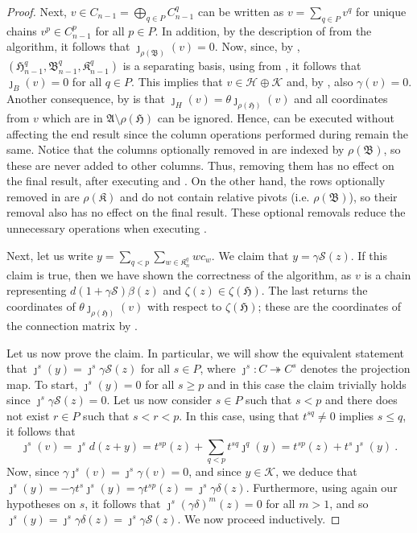 \documentclass[11pt, table, nothms]{amsart}
\theoremstyle{definition}
\newcommand{\C}{C}
\newcommand{\cK}{\mathcal{K}}
\newcommand{\cS}{\mathcal{S}}
\newcommand{\cH}{\mathcal{H}}
\newcommand{\fA}{\mathfrak{A}}
\newcommand{\fB}{\mathfrak{B}}
\newcommand{\fH}{\mathfrak{H}}
\newcommand{\fK}{\mathfrak{K}}
\begin{document}
{\begin{proof}
    Next, $v\in C_{n-1}=\bigoplus_{q \in P} \C^q_{n-1}$ can be written as $v=\sum_{q \in P} v^q$ for unique chains $v^p\in \C^p_{n-1}$ for all $p \in P$.
    In addition, by the description of  from the algorithm, it follows that $\jmath_{\rho(\fB)}(v)=0$.
    Now, since, by , $(\fH^q_{n-1}, \fB^q_{n-1}, \fK^q_{n-1})$ is a separating basis, using  from , it follows that $\jmath_B(v)=0$ for all $q \in P$.
    This implies that $v \in \cH \oplus \cK$ and, by , also $\gamma(v)=0$.
    Another consequence, by   is that $\jmath_H(v)=\theta \jmath_{\rho(\fH)}(v)$ and all coordinates from $v$ which are in $\fA \setminus \rho(\fH)$ can be ignored.
    Hence,  can be executed without affecting the end result since the column operations performed during  remain the same.
    Notice that the columns optionally removed in  are indexed by $\rho(\fB)$, so these are never added to other columns. 
    Thus, removing them has no effect on the final result, after executing  and . 
    On the other hand, the rows optionally removed in  are $\rho(\fK)$ and do not contain relative pivots (i.e. $\rho(\fB)$), so their removal also has no effect on the final result. 
    These optional removals reduce the unnecessary operations when executing .

    Next, let us write $y=\sum_{q < p}\sum_{w \in \fK^q_n} wc_w$.
    We claim that $y=\gamma\cS(z)$. 
    If this claim is true, then we have shown the correctness of the algorithm, as $v$ is a chain representing $d(1 + \gamma \cS)\beta(z)$ and $\zeta(z) \in \zeta(\fH)$. The last  returns the coordinates of $\theta \jmath_{\rho(\fH)}(v)$ with respect to $\zeta(\fH)$; these are the coordinates of the connection matrix by .
    
    Let us now prove the claim. 
    In particular, we will show the equivalent statement that $\jmath^s(y) = \jmath^s \gamma\cS(z)$ for all $s \in P$, where $\jmath^s\colon C \twoheadrightarrow \C^s$ denotes the projection map.
    To start, $\jmath^s(y)=0$ for all $s\geq p$ and in this case the claim trivially holds since $\jmath^s\gamma\cS(z)=0$.
    Let us now consider $s \in P$ such that $s < p$ and there does not exist $r \in P$ such that $s<r<p$. 
    In this case, using that $t^{sq}\neq 0$ implies $s\leq q$, it follows that
    \[
    \jmath^s(v) = \jmath^s d(z + y) = 
    t^{sp}(z) + \sum_{q<p} t^{sq}\jmath^q(y) = 
    t^{sp}(z) + t^s\jmath^s(y)\ .
    \]
    Now, since $\gamma\jmath^s(v) = \jmath^s\gamma(v)=0$, and since $y \in \cK$, we deduce that
    $
    \jmath^s(y)=-\gamma t^s\jmath^s(y)= \gamma t^{sp}(z) = \jmath^s \gamma \delta(z).
    $
    Furthermore, using again our hypotheses on $s$, it follows that $\jmath^s(\gamma \delta)^m(z)=0$ for all $m>1$, and so
    $\jmath^s(y) = \jmath^s \gamma \delta(z) = \jmath^s \gamma\cS(z)$.
    We now proceed inductively.
    

\end{proof}}
\end{document}

